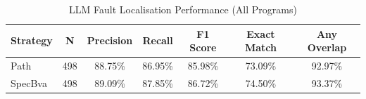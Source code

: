 \begin{table}[htbp]
\centering
\caption{LLM Fault Localisation Performance (All Programs)}
\label{tab:llm_metrics_all}
\begin{tabular}{l c c c c c c}
\hline
\textbf{Strategy} & \textbf{N} & \textbf{Precision} & \textbf{Recall} & \textbf{F1 Score} & \textbf{Exact Match} & \textbf{Any Overlap} \\
\hline
Path & 498 & 88.75\% & 86.95\% & 85.98\% & 73.09\% & 92.97\% \\
SpecBva & 498 & 89.09\% & 87.85\% & 86.72\% & 74.50\% & 93.37\% \\
\hline
\end{tabular}
\end{table}
